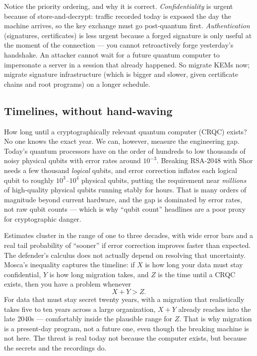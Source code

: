 \begin{focusbox}
Notice the priority ordering, and why it is correct. \emph{Confidentiality} is urgent because of store-and-decrypt: traffic recorded today is exposed the day the machine arrives, so the key exchange must go post-quantum first. \emph{Authentication} (signatures, certificates) is less urgent because a forged signature is only useful at the moment of the connection --- you cannot retroactively forge yesterday's handshake. An attacker cannot wait for a future quantum computer to impersonate a server in a session that already happened. So migrate KEMs now; migrate signature infrastructure (which is bigger and slower, given certificate chains and root programs) on a longer schedule.
\end{focusbox}

\subsection{Timelines, without hand-waving}
\label{ch35:timelines}

How long until a cryptographically relevant quantum computer (CRQC) exists? No one knows the exact year. We can, however, measure the engineering gap. Today's quantum processors have on the order of hundreds to low thousands of noisy physical qubits with error rates around $10^{-3}$. Breaking RSA-2048 with Shor needs a few thousand \emph{logical} qubits, and error correction inflates each logical qubit to roughly $10^3$--$10^4$ physical qubits, putting the requirement near \emph{millions} of high-quality physical qubits running stably for hours. That is many orders of magnitude beyond current hardware, and the gap is dominated by error rates, not raw qubit counts --- which is why ``qubit count'' headlines are a poor proxy for cryptographic danger.

Estimates cluster in the range of one to three decades, with wide error bars and a real tail probability of ``sooner'' if error correction improves faster than expected. The defender's calculus does not actually depend on resolving that uncertainty. Mosca's inequality captures the timeline: if $X$ is how long your data must stay confidential, $Y$ is how long migration takes, and $Z$ is the time until a CRQC exists, then you have a problem whenever
\[
  X + Y > Z.
\]
For data that must stay secret twenty years, with a migration that realistically takes five to ten years across a large organization, $X+Y$ already reaches into the late 2040s --- comfortably inside the plausible range for $Z$. That is why migration is a present-day program, not a future one, even though the breaking machine is not here. The threat is real today not because the computer exists, but because the secrets and the recordings do.

